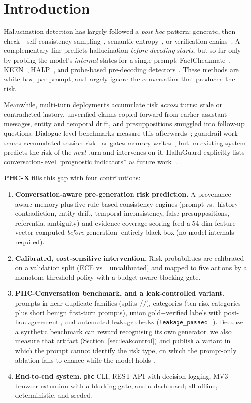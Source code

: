 \documentclass[10pt]{article}
\begin{document}
\section{Introduction}
Hallucination detection has largely followed a \emph{post-hoc} pattern:
generate, then check---self-consistency sampling~\cite{selfcheckgpt},
semantic entropy~\cite{kuhn2023}, or verification chains~\cite{cove}.
A complementary line predicts hallucination \emph{before decoding starts},
but so far only by probing the model's \emph{internal} states for a single
prompt: FactCheckmate~\cite{factcheckmate}, KEEN~\cite{keen},
HALP~\cite{halp}, and probe-based pre-decoding
detectors~\cite{miftakhova2026,hallutracer}. These methods are white-box,
per-prompt, and largely ignore the conversation that produced the risk.

Meanwhile, multi-turn deployments accumulate risk \emph{across} turns:
stale or contradicted history, unverified claims copied forward from earlier
assistant messages, entity and temporal drift, and presuppositions smuggled
into follow-up questions. Dialogue-level benchmarks measure this
afterwards~\cite{dihalu,halluhard}; guardrail work scores accumulated
session risk~\cite{statefulguardrails} or gates memory
writes~\cite{consistencygate}, but no existing system predicts the risk of
the \emph{next} turn and intervenes on it. HalluGuard explicitly lists
conversation-level ``prognostic indicators'' as future work~\cite{hallugarid}.

\textbf{PHC-X} fills this gap with four contributions:
\begin{enumerate}
\item \textbf{Conversation-aware pre-generation risk prediction.} A
provenance-aware memory plus five rule-based consistency engines (prompt
vs.\ history contradiction, entity drift, temporal inconsistency, false
presuppositions, referential ambiguity) and evidence-coverage scoring feed a
54-dim feature vector computed \emph{before} generation, entirely
black-box (no model internals required).
\item \textbf{Calibrated, cost-sensitive intervention.} Risk probabilities
are calibrated on a validation split (ECE \ece{} vs.\ \uece{} uncalibrated)
and mapped to five actions by a monotone threshold policy with a
budget-aware blocking gate.
\item \textbf{PHC-Conversation benchmark, and a leak-controlled variant.}
\nrows{} prompts in \nfamilies{} near-duplicate families (splits
\ntrain/\nval/\ntest), \ncategories{} categories (ten risk categories plus
short benign first-turn prompts), union gold+verified labels with post-hoc
agreement \agreement{}, and automated leakage checks
(\texttt{leakage\_passed}=\leakage). Because a synthetic benchmark can
reward recognising its own generator, we also measure that artifact
(Section~\ref{sec:leakcontrol}) and publish a variant in which the prompt
cannot identify the risk type, on which the prompt-only ablation falls to
chance while the model holds \lcauc{}.
\item \textbf{End-to-end system.} \texttt{phc} CLI, REST API with decision
logging, MV3 browser extension with a blocking gate, and a dashboard; all
offline, deterministic, and seeded.
\end{enumerate}
\end{document}
